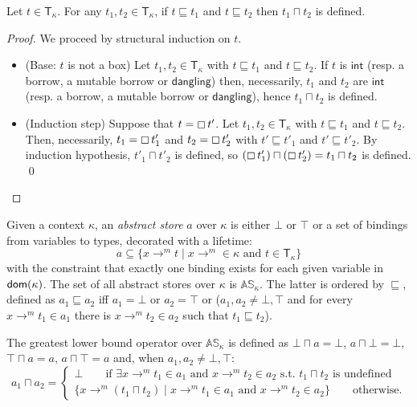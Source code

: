 \begin{lemma}\label{lemma:technical-type}
  Let $t\in\mathsf{T}_\kappa$. For any $t_1,t_2\in\mathsf{T}_\kappa$,
  if $t\sqsubseteq t_1$ and $t\sqsubseteq t_2$ then $t_1\sqcap t_2$ is defined.
\end{lemma}
\begin{proof}
  We proceed by structural induction on $t$.
  \begin{itemize}
    \item (Base: $t$ is not a box)
    Let $t_1,t_2\in\mathsf{T}_\kappa$ with $t\sqsubseteq t_1$ and $t\sqsubseteq t_2$.
    If $t$ is $\mathsf{int}$ (resp. a borrow, a mutable borrow or $\mathsf{dangling}$)
    then, necessarily, $t_1$ and $t_2$ are $\mathsf{int}$ (resp. a borrow,
    a mutable borrow or $\mathsf{dangling}$), hence $t_1\sqcap t_2$ is defined.
    \item (Induction step) Suppose that $t = \boxempty\,{t'}$.
    Let $t_1,t_2\in\mathsf{T}_\kappa$ with $t\sqsubseteq t_1$ and $t\sqsubseteq t_2$.
    Then, necessarily, $t_1 = \boxempty\,{t'_1}$ and $t_2 = \boxempty\,{t'_2}$
    with $t'\sqsubseteq t'_1$ and $t'\sqsubseteq t'_2$. By induction
    hypothesis, $t'_1\sqcap t'_2$ is defined, so
    $(\boxempty\,{t'_1}) \sqcap (\boxempty\,{t'_2}) = t_1 \sqcap t_2$ is defined.
    \qed
  \end{itemize}
\end{proof}

\begin{definition}
  \label{def:abstract-store}
  Given a context $\kappa$, an \emph{abstract store} $a$ over $\kappa$ is either $\bot$ or $\top$
  or a set of bindings from variables to types, decorated with a lifetime:
  \[
  a\subseteq\{x\to^m t\mid x\to^m\in\kappa\text{ and }t\in\mathsf{T_\kappa}\}
  \]
  with the constraint that exactly one binding exists for each given variable in $\mathsf{dom}(\kappa)$.
  The set of all abstract stores over $\kappa$ is $\mathbb{AS}_\kappa$.
  The latter is ordered by $\sqsubseteq$, defined as $a_1\sqsubseteq a_2$ iff
  $a_1=\bot$ or $a_2=\top$ or
  ($a_1,a_2\not=\bot,\top$ and for every $x\to^mt_1\in a_1$ there is $x\to^mt_2\in a_2$
  such that $t_1\sqsubseteq t_2$).
\end{definition}

\begin{definition}
  The greatest lower bound operator over $\mathbb{AS}_\kappa$ is defined as
  $\bot\sqcap a=\bot$, $a\sqcap \bot=\bot$, $\top\sqcap a=a$, $a\sqcap\top=a$ and,
  when $a_1,a_2\not=\bot,\top$:
  \[
  a_1\sqcap a_2=\begin{cases}
  \bot\qquad\text{if $\exists x\to^m t_1\in a_1$ and $x\to^m t_2\in a_2$ s.t.\ $t_1\sqcap t_2$ is undefined}\\
  \{x\to^m(t_1\sqcap t_2)\mid x\to^m t_1\in a_1\text{ and }x\to^m t_2\in a_2\}\qquad\text{otherwise.}
  \end{cases}
  \]
\end{definition}


